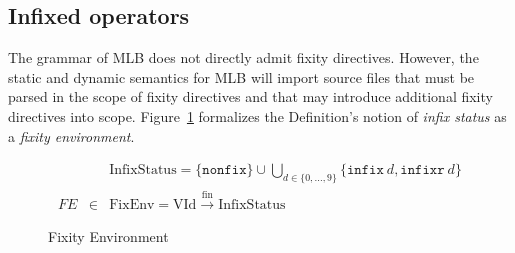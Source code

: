 \documentclass[draft]{article}
\renewcommand{\mit}[1]{\mathit{#1}}
\newcommand{\mrm}[1]{\mathrm{#1}}
\newcommand{\mtt}[1]{\mathtt{#1}}
\begin{document}
\subsection{Infixed operators}
The grammar of MLB does not directly admit fixity directives.
However, the static and dynamic semantics for MLB will import source
files that must be parsed in the scope of fixity directives and that
may introduce additional fixity directives into scope.
Figure~\ref{fig:mlb:S:FixityEnv} formalizes the Definition's notion of
\emph{infix status} as a \emph{fixity environment}.
\begin{figure}[h]
\begin{displaymath}
\begin{array}{rcl}
 & & \mrm{InfixStatus} = \{\mtt{nonfix}\} \cup \bigcup_{d \in \{0,\ldots,9\}} \{\mtt{infix}~d, \mtt{infixr}~d\} \\
\mit{FE} & \in & \mrm{FixEnv} = \mrm{VId} \xrightarrow{\mrm{fin}} \mrm{InfixStatus} \end{array}
\end{displaymath}
\caption{Fixity Environment}\label{fig:mlb:S:FixityEnv}
\end{figure}
%
\end{document}
